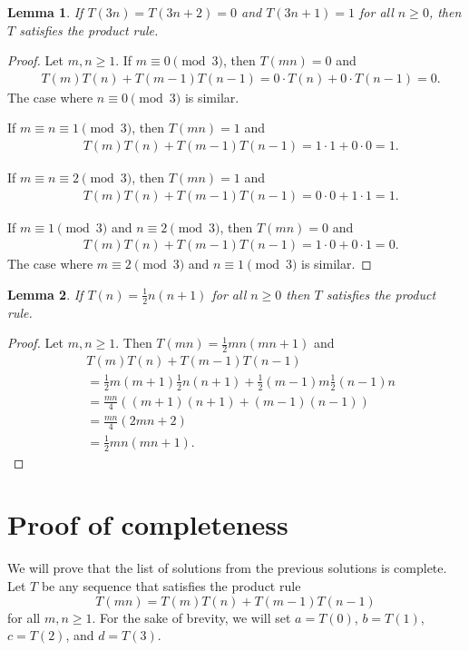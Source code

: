 \documentclass[11pt,fleqn]{amsart}
\newtheorem{lemma}{Lemma}
\begin{document}
\begin{lemma}
If $T(3n) = T(3n+2) = 0$ and $T(3n+1)=1$ for all $n \ge 0$, then 
$T$ satisfies the product rule.
\end{lemma}

\begin{proof}
Let $m, n \ge 1$. If $m \equiv 0 \pmod{3}$, then $T(mn) = 0$ and
\begin{align*}
& T(m) T(n) + T(m-1) T(n-1) = 0 \cdot T(n) + 0 \cdot T(n-1) = 0.
\end{align*}
The case where $n \equiv 0 \pmod{3}$ is similar.
 
If $m \equiv n \equiv 1 \pmod{3}$, then $T(mn) = 1$ and
\begin{align*}
& T(m) T(n) + T(m-1) T(n-1) = 1 \cdot 1 + 0 \cdot 0 = 1. 
\end{align*}

If $m \equiv n \equiv 2 \pmod{3}$, then $T(mn) = 1$ and
\begin{align*}
& T(m) T(n) + T(m-1) T(n-1) = 0 \cdot 0 + 1 \cdot 1 = 1.
\end{align*}

If $m \equiv 1 \pmod{3}$ and $n \equiv 2 \pmod{3}$, then $T(mn) = 0$ and
\begin{align*}
& T(m) T(n) + T(m-1) T(n-1) = 1 \cdot 0 + 0 \cdot 1 = 0.
\end{align*}
The case where $m \equiv 2 \pmod{3}$ and $n \equiv 1 \pmod{3}$ is similar.

\end{proof}

\begin{lemma} If $T(n) = \frac12 n(n+1)$ for all $n \ge 0$ 
then $T$ satisfies the product rule.
\end{lemma}

\begin{proof}
Let $m, n \ge 1$. Then $T(mn) = \frac12 mn(mn+1)$ and
\begin{align*}
& T(m) T(n) + T(m-1) T(n-1)  \\
& = \frac12 m(m+1) \frac12 n(n+1) + \frac12 (m-1)m \frac12 (n-1)n \\
& = \frac{mn}{4} \left( (m+1)(n+1) + (m-1)(n-1) \right) \\
& = \frac{mn}{4} (2mn + 2)\\
&= \frac12 mn(mn+1).
\end{align*}
\end{proof}

\section{Proof of completeness}
We will prove that the list of solutions from the previous solutions is complete. Let $T$ be any sequence
that satisfies the product rule $$T(mn) = T(m) T(n) + T(m-1) T(n-1)$$ 
for all $m, n \ge 1$. For the sake of brevity, we will
set $a = T(0)$, $b = T(1)$, $c =T(2)$, and $d = T(3)$.
\end{document}
